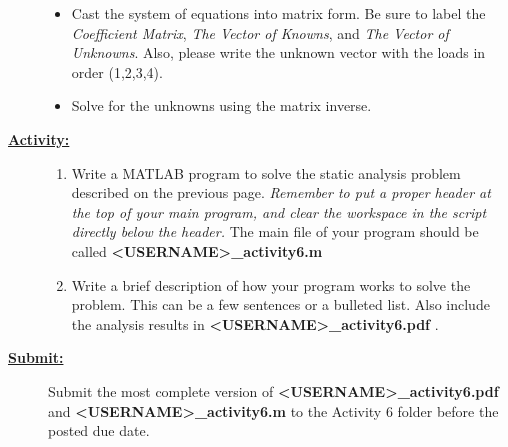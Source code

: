 \documentclass[12pt]{article}
\newcommand{\ANUM}{6} %
\begin{document}
\begin{description}
\begin{itemize}
	
	\item Cast the system of equations into matrix form. Be sure to label the {\it Coefficient Matrix}, {\it The Vector of Knowns}, and {\it The Vector of Unknowns}. Also, please write the unknown vector with the loads in order (1,2,3,4).\vspace{10mm}
	
	
	\item Solve for the unknowns using the matrix inverse. 
	
	\end{itemize}


\item[\textbf{\underline{Activity:}}] \hfill \vspace{0mm}

\begin{enumerate}
	

	\item Write a MATLAB program to solve the static analysis problem described on the previous page. {\it Remember to put a proper header at the top of your main program, and clear the workspace in the script directly below the header. } The main file of your program should be called {\bf \BL<USERNAME>\BK\_activity\ANUM.m}
	
	
	\item Write a brief description of how your program works to solve the problem. This can be a few sentences or a bulleted list. Also include the analysis results in  {\bf \BL<USERNAME>\BK\_activity\ANUM.pdf }.
	
	
\end{enumerate}

\item[\textbf{\underline{Submit:}}] \hfill \vspace{0mm}

		Submit the most complete version of {\bf \BL<USERNAME>\BK\_activity\ANUM.pdf} \\and {\bf \BL<USERNAME>\BK\_activity6.m } to the Activity \ANUM \hspace{1mm} folder before the posted due date.

\end{description}
\end{document}
